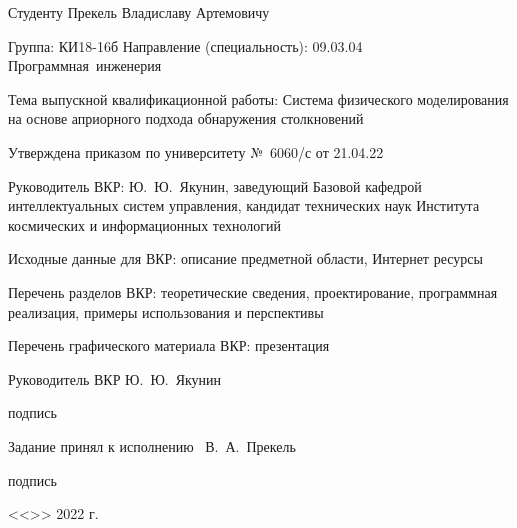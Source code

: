{
Студенту Прекель Владиславу Артемовичу

Группа: КИ18-16б Направление (специальность): 09.03.04 Программная~инженерия

Тема выпускной квалификационной работы: Система физического моделирования на основе априорного подхода обнаружения столкновений

Утверждена приказом по университету №~6060/с от 21.04.22

Руководитель ВКР: Ю.~Ю.~Якунин, заведующий Базовой кафедрой интеллектуальных систем управления, кандидат технических наук
Института космических и информационных технологий

Исходные данные для ВКР: описание предметной области, Интернет ресурсы

Перечень разделов ВКР: теоретические сведения, проектирование, программная реализация, примеры использования и перспективы

Перечень графического материала ВКР: презентация

\vfill

\setlength{\parindent}{0cm}

Руководитель ВКР
\hfill
\uline{\hspace{10.5ex}}
\hspace{6ex}
Ю.~Ю.~Якунин

\vspace{-4pt}

\hfill
{\footnotesize подпись}
\hspace{23ex}


Задание принял к исполнению~
\hfill
\uline{\hspace{10.5ex}}
\hspace{7ex}
В.~А.~Прекель

\vspace{-4pt}

\hfill
{\footnotesize подпись}
\hspace{23ex}

\vspace{1em}

\hfill <<\uline{\hspace{3ex}}>> \uline{\hspace{9ex}} 2022 г.
}

\thispagestyle{empty}

\clearpage
